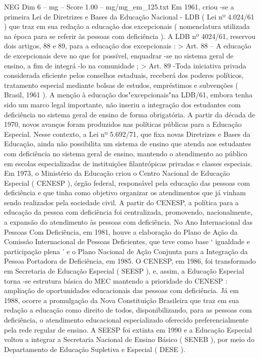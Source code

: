 \begin{textsample}{NEG Dim 6 – mg – Score 1.00 – mg/mg\_em\_125.txt}
Em 1961, criou -se a primeira Lei de Diretrizes e Bases da Educação Nacional - LDB ( Lei nº 4.024/61 ) que traz em sua redação a educação dos excepcionais ( nomenclatura utilizada na época para se referir às pessoas com deficiência ).
A LDB nº 4024/61, reservou dois artigos, 88 e 89, para a educação dos excepcionais : > Art. 88 – A educação de excepcionais deve no que for possível, enquadrar -se no sistema geral de ensino, a fim de integrá -lo na comunidade ; > Art. 89 -Toda iniciativa privada considerada eficiente pelos conselhos estaduais, receberá dos poderes políticos, tratamento especial mediante bolsas de estudos, empréstimos e subvenções ( Brasil, 1961 ).
A menção à educação dos"excepcionais"na LDB/61, embora tenha sido um marco legal importante, não inseriu a integração dos estudantes com deficiência no sistema geral de ensino de forma obrigatória.
A partir da década de 1970, novos avanços foram produzidos nas políticas públicas para a Educação Especial.
Nesse contexto, a Lei nº 5.692/71, que fixa novas Diretrizes e Bases da Educação, ainda não possibilita um sistema de ensino que atenda aos estudantes com deficiência no sistema geral de ensino, mantendo o atendimento ao público em escolas especializadas de instituições filantrópicas privadas e classes especiais.
Em 1973, o Ministério da Educação criou o Centro Nacional de Educação Especial ( CENESP ), órgão federal, responsável pela educação das pessoas com deficiência e que tinha como objetivo organizar os atendimentos que já vinham sendo realizados pela sociedade civil.
A partir do CENESP, a política para a educação da pessoa com deficiência foi centralizada, promovendo, nacionalmente, a expansão do atendimento às pessoas com deficiência.
No Ano Internacional das Pessoas Com Deficiência, em 1981, houve a elaboração do Plano de Ação da Comissão Internacional de Pessoas Deficientes, que teve como base ‘ igualdade e participação plena ’ e o Plano Nacional de Ação Conjunta para a Integração da Pessoa Portadora de Deficiência, em 1985.
O CENESP, em 1986, foi transformado em Secretaria de Educação Especial ( SEESP ), e, assim, a Educação Especial torna -se estrutura básica do MEC mantendo a prioridade do CENESP : ampliação de oportunidades educacionais das pessoas com deficiência.
Já em 1988, ocorre a promulgação da Nova Constituição Brasileira que traz em sua redação a educação como direito de todos, disponibilizando, para as pessoas com deficiência, o atendimento educacional especializado oferecido preferencialmente pela rede regular de ensino.
A SEESP foi extinta em 1990 e a Educação Especial voltou a integrar a Secretaria Nacional de Ensino Básico ( SENEB ), por meio do Departamento de Educação Supletiva e Especial ( DESE ).

\end{textsample}
